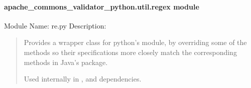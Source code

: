 \documentclass[letterpaper,10pt,english]{sphinxmanual}
\begin{document}
\paragraph{apache\_commons\_validator\_python.util.regex module}
\label{\detokenize{apache_commons_validator_python.util:module-apache_commons_validator_python.util.regex}}\label{\detokenize{apache_commons_validator_python.util:apache-commons-validator-python-util-regex-module}}
\sphinxAtStartPar
Module Name: re.py
Description:
\begin{quote}

\sphinxAtStartPar
Provides a wrapper class for python’s  module, by overriding some of the methods so their
specifications more closely match the corresponding methods in Java’s  package.

\sphinxAtStartPar
Used internally in , and dependencies.
\end{quote}
\end{document}
